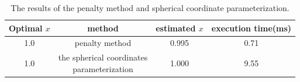 \documentclass[a4paper,12pt]{article}
\begin{document}
\begin{table}[!ht]
\begin{center}
\begin{tabular}{|c|c|c|c|}
\hline
Optimal $x$& method & estimated $x$&execution time(ms)\\
\hline
1.0& penalty method&0.995&0.71\\
\hline
1.0&  \makecell{ the spherical coordinates \\parameterization}&1.000&9.55\\

\hline
\end{tabular}
\end{center}
\caption{The results of the penalty method and spherical coordinate parameterization.}
\label{tab:line}
\end{table}










  
 
\end{document}
